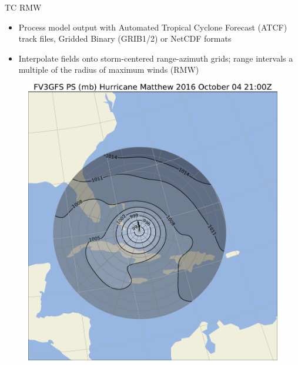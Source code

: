 \documentclass[final]{beamer}
\newlength{\onecolwid}
\newlength{\twocolwid}
\begin{document}
\begin{frame}[t]
\begin{columns}[t]
\begin{column}{\twocolwid}

\begin{columns}[t,totalwidth=\twocolwid] %

\begin{column}{\onecolwid} %


\begin{block}{TC RMW}

\begin{itemize}
\item Process model output with Automated Tropical Cyclone Forecast
(ATCF) track files, Gridded Binary (GRIB1/2) or NetCDF formats
\item Interpolate fields onto storm-centered range-azimuth grids;
range intervals a multiple of the radius of maximum winds (RMW)
\end{itemize}
\vspace{1in}
\begin{figure}
\includegraphics[width=1.0\linewidth]{../plots/PRMSL_2016100421.pdf}

\end{figure}
\end{block}
\end{column}
\end{columns}
\end{column}
\end{columns}
\end{frame}
\end{document}
